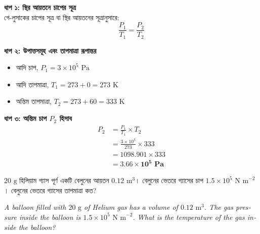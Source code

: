 \documentclass[12pt, a4paper]{article}
\begin{document}
\begin{tcolorbox}[solutionbox={সমাধান (Solution)}]
    \noindent
    \textbf{ধাপ ১: স্থির আয়তনে চাপের সূত্র} \\
    গে-লুসাকের চাপের সূত্র বা স্থির আয়তনের সূত্রানুসারে:
    \[ \frac{P_1}{T_1} = \frac{P_2}{T_2} \]
    
    \vspace{0.4em}
    \noindent\textbf{ধাপ ২: উপাত্তসমূহ এবং তাপমাত্রা রূপান্তর}
    \begin{itemize}[leftmargin=1.5em, itemsep=0.2em]
        \item আদি চাপ, $P_1 = 3 \times 10^5\text{ Pa}$
        \item আদি তাপমাত্রা, $T_1 = 273 + 0 = 273\text{ K}$
        \item অন্তিম তাপমাত্রা, $T_2 = 273 + 60 = 333\text{ K}$
    \end{itemize}
    
    \vspace{0.4em}
    \noindent\textbf{ধাপ ৩: অন্তিম চাপ $P_2$ হিসাব}
    \begin{align*}
        P_2 &= \frac{P_1}{T_1} \times T_2 \\
        &= \frac{3 \times 10^5}{273} \times 333 \\
        &= 1098.901 \times 333 \\
        &= \mathbf{3.66 \times 10^5\text{ Pa}}
    \end{align*}
\end{tcolorbox}

\vspace{2em}

\begin{tcolorbox}[questionbox={প্রশ্ন (Question) 3}]
    \noindent
    $20\text{ g}$ হিলিয়াম গ্যাস পূর্ণ একটি বেলুনের আয়তন $0.12\text{ m}^3$। বেলুনের ভেতরে গ্যাসের চাপ $1.5 \times 10^5\text{ N m}^{-2}$। বেলুনের ভেতরে গ্যাসের তাপমাত্রা কত?
    
    \vspace{0.8em}
    \begin{english}
    \noindent\textit{\color{darkgray}
    A balloon filled with $20\text{ g}$ of Helium gas has a volume of $0.12\text{ m}^3$. The gas pressure inside the balloon is $1.5 \times 10^5\text{ N m}^{-2}$. What is the temperature of the gas inside the balloon?
    }
    \end{english}
\end{tcolorbox}
\end{document}
